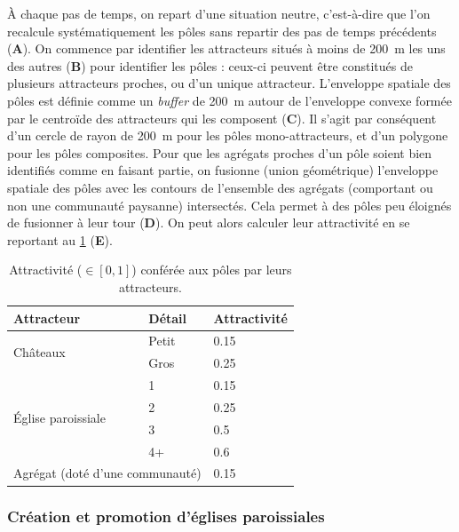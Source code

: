 À chaque pas de temps, on repart d'une situation \og neutre\fg{}, c'est-à-dire que l'on recalcule systématiquement les pôles sans repartir des pas de temps précédents (\textbf{A}).
On commence par identifier les attracteurs situés à moins de 200~m les uns des autres (\textbf{B}) pour identifier les pôles : ceux-ci peuvent être constitués de plusieurs attracteurs proches, ou d'un unique attracteur.
L'enveloppe spatiale des pôles est définie comme un \textit{buffer} de 200~m autour de l'enveloppe convexe formée par le centroïde des attracteurs qui les composent (\textbf{C}).
Il s'agit par conséquent d'un cercle de rayon de 200~m pour les pôles mono-attracteurs, et d'un polygone pour les pôles composites.
Pour que les agrégats proches d'un pôle soient bien identifiés comme en faisant partie, on fusionne (union géométrique) l'enveloppe spatiale des pôles avec les contours de l'ensemble des agrégats (comportant ou non une communauté paysanne) intersectés.
Cela permet à des pôles peu éloignés de fusionner à leur tour (\textbf{D}).
On peut alors calculer leur attractivité en se reportant au \cref{tab:attraction-poles} (\textbf{E}).

\begin{table}[H]
	\centering
	{\renewcommand{\arraystretch}{1.1}%
	\begin{tabular}{|l|l|l|}\hline
		\textbf{Attracteur} & \textbf{Détail} & \textbf{Attractivité} \\ \hline
		\multirow{2}{*}{Châteaux} & Petit & 0.15 \\
		& Gros & 0.25 \\ \hline
		\multirow{4}{*}{Église paroissiale} & 1 & 0.15 \\
		& 2 & 0.25 \\
		& 3 & 0.5 \\
		& 4+ & 0.6 \\ \hline
		\multicolumn{2}{|l|}{Agrégat (doté d'une communauté)} & 0.15 \\ \hline
	\end{tabular}}
\caption[Attractivité conférée aux pôles par leurs attracteurs.]{Attractivité ($\in [0,1]$) conférée aux pôles par leurs attracteurs.}
\label{tab:attraction-poles}
\end{table}


	
\subsubsection{Création et promotion d'églises paroissiales \label{sssec:paroisses}}

